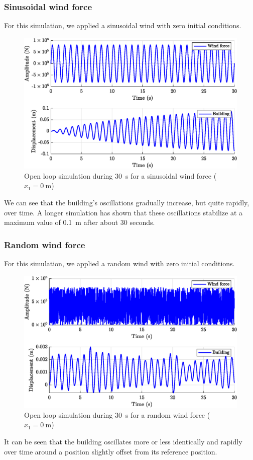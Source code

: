 \subsubsection{Sinusoidal wind force}
For this simulation, we applied a sinusoidal wind with zero initial conditions.
\begin{figure}[H]
    \centering
    \includegraphics[width=\textwidth]{resources/eps/2_sinusoidal-wind.eps}
    \caption{Open loop simulation during \SI{30}{\second} for a sinusoidal wind force ($x_1=\SI{0}{\meter}$)}
\end{figure}
We can see that the building's oscillations gradually increase, but quite rapidly, over time. A longer simulation has shown that these oscillations stabilize at a maximum value of \SI{0.1}{\meter} after about 30 seconds.

\subsubsection{Random wind force}
For this simulation, we applied a random wind with zero initial conditions.
\begin{figure}[H]
    \centering
    \includegraphics[width=\textwidth]{resources/eps/2_random-wind.eps}
    \caption{Open loop simulation during \SI{30}{\second} for a random wind force ($x_1=\SI{0}{\meter}$)}
\end{figure}
It can be seen that the building oscillates more or less identically and rapidly over time around a position slightly offset from its reference position.

